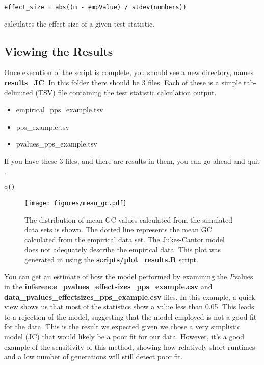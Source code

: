 {\tt \begin{Snugshade}[184,207,236]
\begin{lstlisting}
effect_size = abs((m - empValue) / stdev(numbers))
\end{lstlisting}
\end{Snugshade}}


calculates the effect size of a given test statistic. 


\subsection{Viewing the Results}

Once execution of the script is complete, you should see a new directory, names \textbf{results\_JC}. In this folder there should be 3 files. Each of these is a simple tab-delimited (TSV) file containing the test statistic calculation output.

\begin{itemize}
\item empirical\_pps\_example.tsv
\item pps\_example.tsv
\item pvalues\_pps\_example.tsv
\end{itemize}

If you have these 3 files, and there are results in them, you can go ahead and quit \RevBayes.

{\tt \begin{Snugshade}[184,207,236]
\begin{lstlisting}  
q()
\end{lstlisting}
\end{Snugshade}}

\begin{figure}[!t]
\centering
\texttt{[image: figures/mean\_gc.pdf]}
\caption{\small 
The distribution of mean GC values calculated from the simulated data sets
is shown. The dotted line represents the mean GC calculated from the empirical data set.
The Jukes-Cantor model does not adequately describe the empirical data.
    This plot was generated in \R using the \textbf{scripts/plot\_results.R} script.
    }
\end{figure}

You can get an estimate of how the model performed by examining the \textit{P}\-values in the 
\textbf{inference\_pvalues\_effectsizes\_pps\_example.csv} and \textbf{data\_pvalues\_effectsizes\_pps\_example.csv} files. In this example, a quick view shows us that most of the statistics show a value less than 0.05. This leads to a rejection of the model, suggesting 
that the model employed is not a good fit for the data. This is the result we expected given we chose a very 
simplistic model (JC) that would likely be a poor fit for our data. However, it's a good example 
of the sensitivity of this method, showing how relatively short runtimes and a low number of generations will 
still detect poor fit. 


